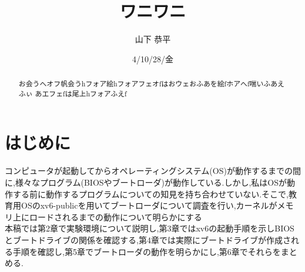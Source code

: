 \documentclass[submit,techreq,noauthor]{eco}	%
\begin{document}
\date   {4/10/28/金}				%
\title  {ワニワニ}	%
\author {山下 恭平}				%


\begin{abstract}
お会うへオフ帆会うhフォア絵hフォアフェオfはおウェおふあを絵fホアへf喘いふあえふぃ
あエフェfは尾上hフォアふえf

\end{abstract}
\maketitle


\section{はじめに}
コンピュータが起動してからオペレーティングシステム(OS)が動作するまでの間に,様々なプログラム(BIOSやブートローダ)が動作している.しかし,私はOSが動作する前に動作するプログラムについての知見を持ち合わせていない.そこで,教育用OSのxv6-publicを用いてブートローダについて調査を行い,カーネルがメモリ上にロードされるまでの動作について明らかにする\\
\indent 本稿では第2章で実験環境について説明し,第3章ではxv6の起動手順を示しBIOSとブートドライブの関係を確認する,第4章では実際にブートドライブが作成される手順を確認し,第5章でブートローダの動作を明らかにし,第6章でそれらをまとめる.
\end{document}
